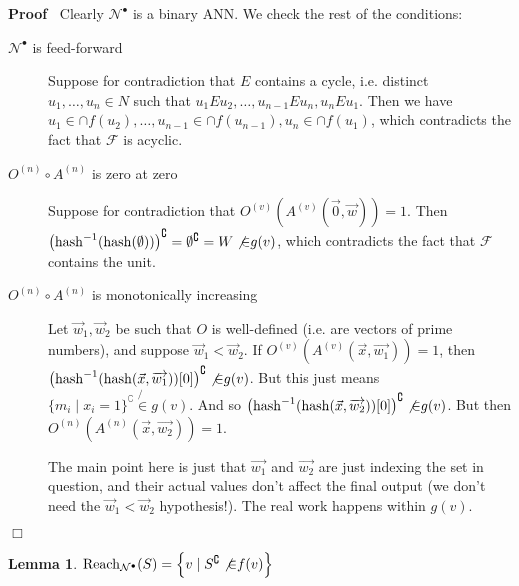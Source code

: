 \documentclass{article}
\newcommand{\op}[1]{#1}
\newcommand{\tmop}[1]{\ensuremath{\operatorname{#1}}}
\newenvironment{proof}{\noindent\textbf{Proof\ }}{\hspace*{\fill}$\Box$\medskip}
\newtheorem{lemma}{Lemma}
\newcommand{\Net}{\ensuremath{\mathcal{N}}}
\newcommand{\hash}{\textsf{\tmop{hash}}}
\newcommand{\Reach}{\textsf{\tmop{Reach}}}
\begin{document}
\begin{proof}
  Clearly $\Net^{\bullet}$ is a binary ANN. We check the rest of the
  conditions:
  \begin{description}
    \item[$\Net^{\bullet}$ is feed-forward] Suppose for contradiction that $E$
    contains a cycle, i.e. distinct $u_1, \ldots, u_n \in N$ such that $u_1
    \op{E} u_2, \ldots, u_{n - 1} \op{E} u_n, u_n \op{E} u_1$. Then we have
    $u_1 \in \cap f (u_2), \ldots, u_{n - 1} \in \cap f (u_{n - 1}), u_n \in
    \cap f (u_1)$, which contradicts the fact that $\mathcal{F}$ is acyclic.
    
    \item[$O^{(n)} \circ A^{(n)}$ is zero at zero] Suppose for contradiction
    that $O^{(v)} (A^{(v)} (\vec{0}, \vec{w})) = 1$. Then $\left( \hash^{- 1}
    (\hash (\emptyset)) \right)^{\complement} = \emptyset^{\complement} = W
    \not{\in} g (v)$, which contradicts the fact that $\mathcal{F}$ contains
    the unit.
    
    \item[$O^{(n)} \circ A^{(n)}$ is monotonically increasing] Let $\vec{w}_1,
    \vec{w}_2$ be such that $O$ is well-defined (i.e. are vectors of prime
    numbers), and suppose $\vec{w}_1 < \vec{w}_2$. If $O^{(v)} (A^{(v)}
    (\vec{x}, \overrightarrow{w_1})) = 1$, then $\left( \hash^{- 1} (\hash
    (\vec{x}, \overrightarrow{w_1})) [0] \right)^{\complement} \not{\in} g
    (v)$. But this just means $\{ m_i \mid x_i = 1 \}^{\complement} \not{\in}
    g (v)$. And so $\left( \hash^{- 1} (\hash (\vec{x}, \overrightarrow{w_2}))
    [0] \right)^{\complement} \not{\in} g (v)$. But then $O^{(n)} (A^{(n)}
    (\vec{x}, \overrightarrow{w_2})) = 1$.
    
    The main point here is just that $\overrightarrow{w_1}$ and
    $\overrightarrow{w_2}$ are just indexing the set in question, and their
    actual values don't affect the final output (we don't need the $\vec{w}_1
    < \vec{w}_2$ hypothesis!). The real work happens within $g (v)$.
  \end{description}
\end{proof}

\begin{lemma}
  \label{lemma-Reach-and-R*}$\Reach_{\Net^{\bullet}} (S) = \left\{ v \mid
  S^{\complement} \not{\in} f (v) \right\}$
\end{lemma}
\end{document}
